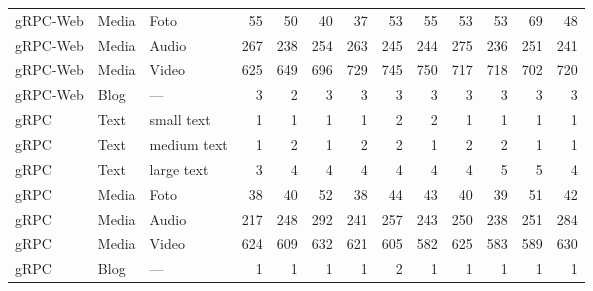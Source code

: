\begin{table}[p]
{\begin{tabular}{|l|l|l|*{10}{r}|}
			gRPC-Web & Media & Foto        & 55 & 50 & 40 & 37 & 53 & 55 & 53 & 53 & 69 & 48 \\
			gRPC-Web & Media & Audio       & 267 & 238 & 254 & 263 & 245 & 244 & 275 & 236 & 251 & 241 \\
			gRPC-Web & Media & Video       & 625 & 649 & 696 & 729 & 745 & 750 & 717 & 718 & 702 & 720 \\
			gRPC-Web & Blog  & —           & 3 & 2 & 3 & 3 & 3 & 3 & 3 & 3 & 3 & 3 \\
			\hline
			gRPC & Text  & small text  & 1 & 1 & 1 & 1 & 2 & 2 & 1 & 1 & 1 & 1 \\
			gRPC & Text  & medium text & 1 & 2 & 1 & 2 & 2 & 1 & 2 & 2 & 1 & 1 \\
			gRPC & Text  & large text  & 3 & 4 & 4 & 4 & 4 & 4 & 4 & 5 & 5 & 4 \\
			gRPC & Media & Foto        & 38 & 40 & 52 & 38 & 44 & 43 & 40 & 39 & 51 & 42 \\
			gRPC & Media & Audio       & 217 & 248 & 292 & 241 & 257 & 243 & 250 & 238 & 251 & 284 \\
			gRPC & Media & Video       & 624 & 609 & 632 & 621 & 605 & 582 & 625 & 583 & 589 & 630 \\
			gRPC & Blog  & —           & 1 & 1 & 1 & 1 & 2 & 1 & 1 & 1 & 1 & 1 \\
			\hline
	\end{tabular}}
\end{table}


\chapterend